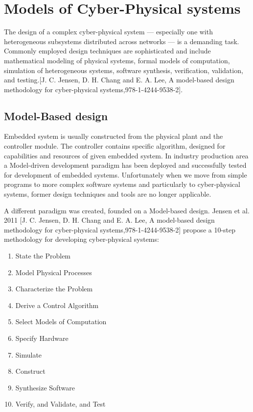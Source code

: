 \documentclass[english,technical,10pt]{FITreport}[2018/01/26]
\begin{document}
\section{Models of Cyber-Physical systems}

The design of a complex cyber-physical system — especially one with heterogeneous subsystems distributed across networks — is a demanding task. Commonly employed design techniques are sophisticated and include mathematical modeling of physical systems, formal models of computation, simulation of heterogeneous systems, software synthesis, verification, validation, and testing.[J. C. Jensen, D. H. Chang and E. A. Lee, A model-based design methodology for cyber-physical systems,978-1-4244-9538-2].

\subsection{Model-Based design}

Embedded system is usually constructed from the physical plant and the controller module. The controller contains specific algorithm, designed for capabilities and resources of given embedded system. In industry production area a Model-driven development paradigm has been deployed and successfully tested for development of embedded systems. Unfortunately when we move from simple programs to more complex software systems and particularly to cyber-physical systems, former design techniques and tools are no longer applicable.

A different paradigm was created, founded on a Model-based design. Jensen et al. 2011  [J. C. Jensen, D. H. Chang and E. A. Lee, A model-based design methodology for cyber-physical systems,978-1-4244-9538-2] propose a 10-step methodology for developing cyber-physical systems:

\begin{enumerate}
\item State the Problem
\item Model Physical Processes
\item Characterize the Problem
\item Derive a Control Algorithm
\item Select Models of Computation
\item Specify Hardware
\item Simulate
\item Construct
\item Synthesize Software
\item Verify, and Validate, and Test
\end{enumerate}
\end{document}

